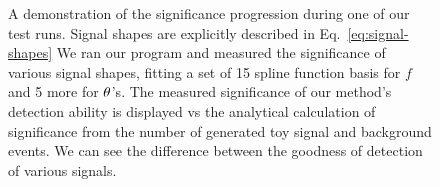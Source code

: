 \documentclass[thesis/Elad_Kliger_Thesis.tex]{subfiles}
\begin{document}
\begin{figure}
    \caption{A demonstration of the significance progression during one of our test runs. Signal shapes are explicitly described in Eq.~\ref{eq:signal-shapes} We ran our program and measured the significance of various signal shapes, fitting a set of 15 spline function basis for $f$ and 5 more for ${\theta}$'s. The measured significance of our method's detection ability is displayed vs the analytical calculation of significance from the number of generated toy signal and background events. We can see the difference between the goodness of detection of various signals.}
    \label{fig:look-elsewhere-significance-example}
\end{figure}
\end{document}
